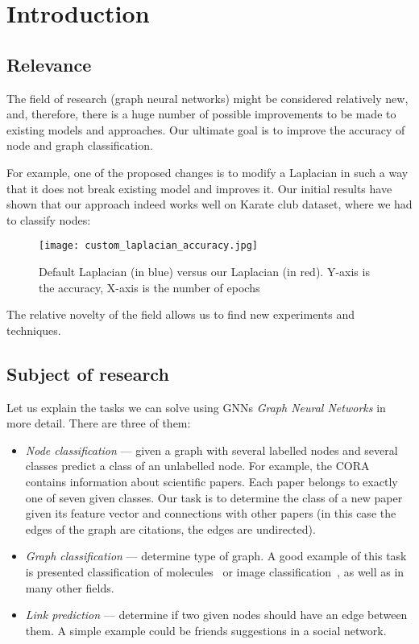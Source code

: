 \section{Introduction}

\subsection{Relevance}
The field of research (graph neural networks) might be considered relatively new, and, therefore, there is a huge number of possible improvements to be made to existing models and approaches.
Our ultimate goal is to improve the accuracy of node and graph classification.

For example, one of the proposed changes is to modify a Laplacian in such a way that it does not break existing model and improves it.
Our initial results have shown that our approach indeed works well on Karate club dataset, where we had to classify nodes:

\begin{figure}[h]
	\centering
	\texttt{[image: custom\_laplacian\_accuracy.jpg]}
	\caption{Default Laplacian (in blue) versus our Laplacian (in red). Y-axis is the accuracy, X-axis is the number of epochs}
\end{figure}

The relative novelty of the field allows us to find new experiments and techniques.

\subsection{Subject of research}
Let us explain the tasks we can solve using GNNs \emph{Graph Neural Networks} in more detail.
There are three of them:
\begin{itemize}
	\item \textit{Node classification} --- given a graph with several labelled nodes and several classes predict a class of an unlabelled node.
	      For example, the CORA~\cite{cora_dataset} contains information about scientific papers.
	      Each paper belongs to exactly one of seven given classes.
	      Our task is to determine the class of a new paper given its feature vector and connections with other papers (in this case the edges of the graph are citations, the edges are undirected).
	\item \textit{Graph classification} --- determine type of graph.
	      A good example of this task is presented classification of molecules~\cite{how_powerful_are_gnns} or image classification~\cite{benchmarking_gnns}, as well as in many other fields.
	\item \textit{Link prediction} --- determine if two given nodes should have an edge between them.
	      A simple example could be friends suggestions in a social network.
\end{itemize}

